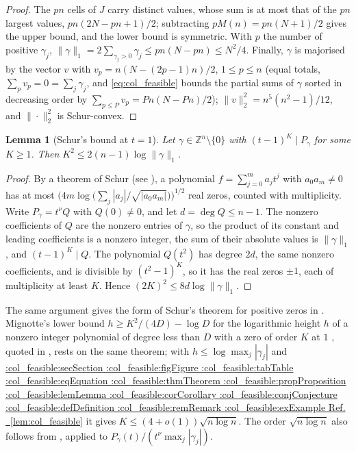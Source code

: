 \documentclass[11pt,a4paper]{article}
\makeatletter
\def\Cref@getprefix#1:#2\relax{#1}
\def\Cref@prefix@sec{sec}
\def\Cref@prefix@fig{fig}
\def\Cref@prefix@tab{tab}
\def\Cref@prefix@eq{eq}
\def\Cref@prefix@thm{thm}
\def\Cref@prefix@prop{prop}
\def\Cref@prefix@lem{lem}
\def\Cref@prefix@cor{cor}
\def\Cref@prefix@conj{conj}
\def\Cref@prefix@def{def}
\def\Cref@prefix@rem{rem}
\def\Cref@prefix@ex{ex}
\def\Cref@type@cap#1{%
  \edef\Cref@tmp{#1}%
  \ifx\Cref@tmp\Cref@prefix@sec Section%
  \else\ifx\Cref@tmp\Cref@prefix@fig Figure%
  \else\ifx\Cref@tmp\Cref@prefix@tab Table%
  \else\ifx\Cref@tmp\Cref@prefix@eq Equation%
  \else\ifx\Cref@tmp\Cref@prefix@thm Theorem%
  \else\ifx\Cref@tmp\Cref@prefix@prop Proposition%
  \else\ifx\Cref@tmp\Cref@prefix@lem Lemma%
  \else\ifx\Cref@tmp\Cref@prefix@cor Corollary%
  \else\ifx\Cref@tmp\Cref@prefix@conj Conjecture%
  \else\ifx\Cref@tmp\Cref@prefix@def Definition%
  \else\ifx\Cref@tmp\Cref@prefix@rem Remark%
  \else\ifx\Cref@tmp\Cref@prefix@ex Example%
  \else Ref.%
  \fi\fi\fi\fi\fi\fi\fi\fi\fi\fi\fi\fi
}
\DeclareRobustCommand{\Cref}[1]{%
  \begingroup
  \edef\Cref@label{#1}%
  \edef\Cref@prefix{\expandafter\Cref@getprefix\Cref@label:\relax}%
  \hyperref[#1]{\Cref@type@cap{\Cref@prefix}~\ref*{#1}}%
  \endgroup
}
\theoremstyle{plain}
\newtheorem{lemma}[theorem]{Lemma}
\theoremstyle{definition}
\theoremstyle{remark}
\newcommand{\Z}{\mathbb{Z}}
\makeatother
\begin{document}
\begin{proof}
The $pn$ cells of $J$ carry distinct values, whose sum is at most that of the $pn$ largest values, $pn(2N-pn+1)/2$; subtracting $pM(n)=pn(N+1)/2$ gives the upper bound, and the lower bound is symmetric.
With $p$ the number of positive $\gamma_j$, $\|\gamma\|_1=2\sum_{\gamma_j>0}\gamma_j\le pn(N-pn)\le N^2/4$.
Finally, $\gamma$ is majorised by the vector $v$ with $v_p=n(N-(2p-1)n)/2$, $1\le p\le n$ (equal totals, $\sum_pv_p=0=\sum_j\gamma_j$, and \eqref{eq:col_feasible} bounds the partial sums of $\gamma$ sorted in decreasing order by $\sum_{p\le P}v_p=Pn(N-Pn)/2$); $\|v\|_2^2=n^5(n^2-1)/12$, and $\|\cdot\|_2^2$ is Schur-convex.
\end{proof}

\begin{lemma}[Schur's bound at $t=1$]
\label{lem:schur}
Let $\gamma\in\Z^{n}\setminus\{0\}$ with $(t-1)^{K}\mid P_\gamma$ for some $K\ge1$.  Then $K^{2}\le 2(n-1)\log\|\gamma\|_1$.
\end{lemma}

\begin{proof}
By a theorem of Schur \cite{schur1933} (see \cite[(1.4)]{erdosturan1950}), a polynomial $f=\sum_{j=0}^ma_jt^j$ with $a_0a_m\ne0$ has at most $\bigl(4m\log\bigl(\sum_j|a_j|/\sqrt{|a_0a_m|}\bigr)\bigr)^{1/2}$ real zeros, counted with multiplicity.
Write $P_\gamma=t^{\nu}Q$ with $Q(0)\ne0$, and let $d=\deg Q\le n-1$.
The nonzero coefficients of $Q$ are the nonzero entries of $\gamma$, so the product of its constant and leading coefficients is a nonzero integer, the sum of their absolute values is $\|\gamma\|_1$, and $(t-1)^K\mid Q$.
The polynomial $Q(t^2)$ has degree $2d$, the same nonzero coefficients, and is divisible by $(t^2-1)^K$, so it has the real zeros $\pm1$, each of multiplicity at least $K$.
Hence $(2K)^2\le8d\log\|\gamma\|_1$.
\end{proof}

The same argument gives the form of Schur's theorem for positive zeros in \cite[Thm.~A]{BEK1999}.
Mignotte's lower bound $h\ge K^2/(4D)-\log D$ for the logarithmic height $h$ of a nonzero integer polynomial of degree less than $D$ with a zero of order $K$ at $1$ \cite{mignotte1982}, quoted in \cite[Sect.~1]{amoroso1995}, rests on the same theorem; with $h\le\log\max_j|\gamma_j|$ and \Cref{lem:col_feasible} it gives $K\le(4+o(1))\sqrt{n\log n}$.
The order $\sqrt{n\log n}$ also follows from \cite[Thms.~2.1 and 2.8]{BEK1999}, applied to $P_\gamma(t)/(t^{\nu}\max_j|\gamma_j|)$.
\end{document}
